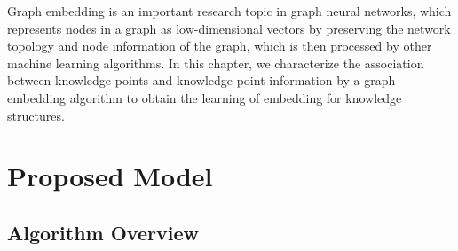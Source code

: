 Graph embedding is an important research topic in graph neural networks, which represents nodes in a graph as low-dimensional vectors by preserving the network topology and node information of the graph, which is then processed by other machine learning algorithms. In this chapter, we characterize the association between knowledge points and knowledge point information by a graph embedding algorithm to obtain the learning of embedding for knowledge structures.



\section{Proposed Model}

\subsection{Algorithm Overview}


